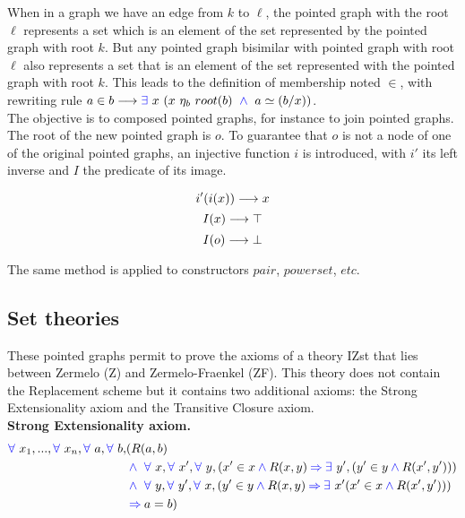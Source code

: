 \documentclass[a4paper]{article}
\begin{document}
\begin{figure}[h]
\centering
{}
\end{figure}

When in a graph we have an edge from $k$ to $\ell$, the pointed graph with the root $\ell$ represents a set which is an element of the set represented by the pointed graph with root $k$. But any pointed graph bisimilar with pointed graph with root $\ell$ also represents a set that is an element of the set represented with the pointed graph with root $k$. This leads to the definition of membership noted $\in$, with rewriting rule $a \in b \longrightarrow {\color{blue} \exists}~x~(x~\eta_b~root(b)~\mathbin{\color{blue} \wedge}~a \simeq (b/x))$. \\

The objective is to composed pointed graphs, for instance to join pointed graphs. The root of the new pointed graph is $o$. To guarantee that $o$ is not a node of one of the original pointed graphs, an injective function $i$ is introduced, with $i'$ its left inverse and $I$ the predicate of its image. 

$$i'(i(x)) \longrightarrow x$$
$$I(x) \longrightarrow \top$$
$$I(o) \longrightarrow \bot$$

The same method is applied to constructors $pair$, $powerset$, $etc$.

\subsection{Set theories}

These pointed graphs permit to prove the axioms of a theory IZst that lies between Zermelo (Z) and Zermelo-Fraenkel (ZF). This theory does not contain the Replacement scheme but it contains two additional axioms: the Strong Extensionality axiom and the Transitive Closure axiom. \\

\textbf{Strong Extensionality axiom.} 
\begin{equation*}
\begin{split}
{\color{blue} \forall}~x_1,...,{\color{blue} \forall}~x_n,{\color{blue} \forall}~a,{\color{blue} \forall}~b, &(R(a, b) \\
&\mathbin{\color{blue} \wedge}~{\color{blue} \forall}~x,{\color{blue} \forall}~x',{\color{blue} \forall}~y,(x' \in x \mathbin{\color{blue} \wedge} R(x, y) \mathbin{\color{blue} \Rightarrow} {\color{blue} \exists}~y', (y' \in y \mathbin{\color{blue} \wedge} R(x', y'))) \\
&\mathbin{\color{blue} \wedge}~{\color{blue} \forall}~y,{\color{blue} \forall}~y',{\color{blue} \forall}~x, (y' \in y \mathbin{\color{blue} \wedge} R(x, y) \mathbin{\color{blue} \Rightarrow} {\color{blue} \exists}~x'(x' \in x \mathbin{\color{blue} \wedge} R(x', y'))) \\
&\mathbin{\color{blue} \Rightarrow} a = b) 
\end{split}
\end{equation*}
\end{document}
